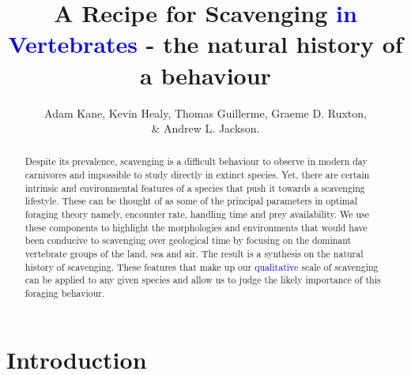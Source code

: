 \documentclass[a4paper,12pt]{article}
\title{A Recipe for Scavenging \textcolor{blue}{in Vertebrates} - the natural history of a behaviour}
\author{Adam Kane, Kevin Healy, Thomas Guillerme, Graeme D. Ruxton, \\ \& Andrew L. Jackson.}
\begin{document}
\maketitle


\begin{abstract} 
Despite its prevalence, scavenging is a difficult behaviour to observe in modern day carnivores and impossible to study directly in extinct species. 
Yet, there are certain intrinsic and environmental features of a species that push it towards a scavenging lifestyle. 
These can be thought of as some of the principal parameters in optimal foraging theory namely, encounter rate, handling time and prey availability. 
We use these components to highlight the morphologies and environments that would have been conducive to scavenging over geological time by focusing on the dominant vertebrate groups of the land, sea and air. 
The result is a synthesis on the natural history of scavenging. 
These features that make up our \textcolor{blue}{qualitative} scale of scavenging can be applied to any given species and allow us to judge the likely importance of this foraging behaviour.   
\end{abstract}

\newpage


\section{Introduction}
\end{document}
